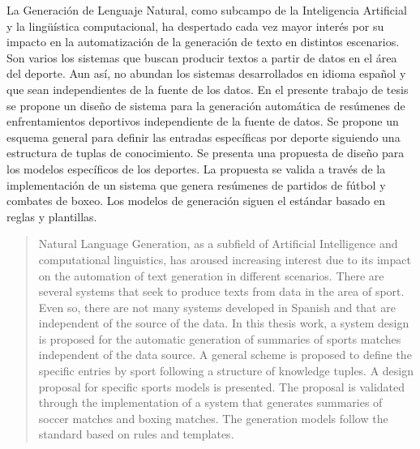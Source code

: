 \begin{resumen}
	La Generación de Lenguaje Natural, como subcampo de la Inteligencia Artificial y la lingüística computacional, ha despertado cada vez mayor interés por su impacto en la 
automatización de la generación de texto en distintos escenarios. Son varios los sistemas que buscan producir textos a partir de datos en el área del deporte. Aun así, 
no abundan los sistemas desarrollados en idioma español y que sean independientes de la fuente de los datos. En el presente trabajo de tesis se propone un diseño de sistema 
para la generación automática de resúmenes de enfrentamientos deportivos independiente de la fuente de datos. Se propone un esquema general para definir las entradas 
específicas por deporte siguiendo una estructura de tuplas de conocimiento. Se presenta una propuesta de diseño para los modelos específicos de los deportes. La propuesta se valida 
a través de la implementación de un sistema que genera resúmenes de partidos de fútbol y combates de boxeo. Los modelos de generación siguen el estándar basado en reglas y plantillas.
\end{resumen}

\begin{abstract}
	Natural Language Generation, as a subfield of Artificial Intelligence and computational linguistics, has aroused increasing interest due to its impact on the automation of text 
generation in different scenarios. There are several systems that seek to produce texts from data in the area of sport. Even so, there are not many systems developed in Spanish and 
that are independent of the source of the data. In this thesis work, a system design is proposed for the automatic generation of summaries of sports matches independent of the data 
source. A general scheme is proposed to define the specific entries by sport following a structure of knowledge tuples. A design proposal for specific sports models is presented. The 
proposal is validated through the implementation of a system that generates summaries of soccer matches and boxing matches. The generation models follow the standard based on rules and 
templates.
\end{abstract}